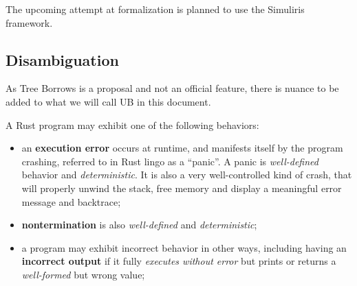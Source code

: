 \documentclass[a4paper,11pt]{article}
\theoremstyle{plain}
\theoremstyle{definition}
\theoremstyle{remark}
\begin{document}
The upcoming attempt at formalization is planned to use the Simuliris \cite{simuliris}
framework.

\subsection{Disambiguation}

As Tree Borrows is a proposal and not an official feature, there is nuance to
be added to what we will call UB in this document.

A Rust program may exhibit one of the following behaviors:
\begin{itemize}
    \item an \textbf{execution error} occurs at runtime, and manifests itself
        by the program crashing, referred to in Rust lingo as a ``panic''. A panic is
        \textit{well-defined} behavior and \textit{deterministic}. It is also
        a very well-controlled kind of crash, that will properly unwind the stack, free
        memory and display a meaningful error message and backtrace;
    \item \textbf{nontermination} is also \textit{well-defined} and \textit{deterministic};
    \item a program may exhibit incorrect behavior in other ways, including having
        an \textbf{incorrect output} if it fully \textit{executes without error} but prints
        or returns a \textit{well-formed} but wrong value;
\end{itemize}
\end{document}
